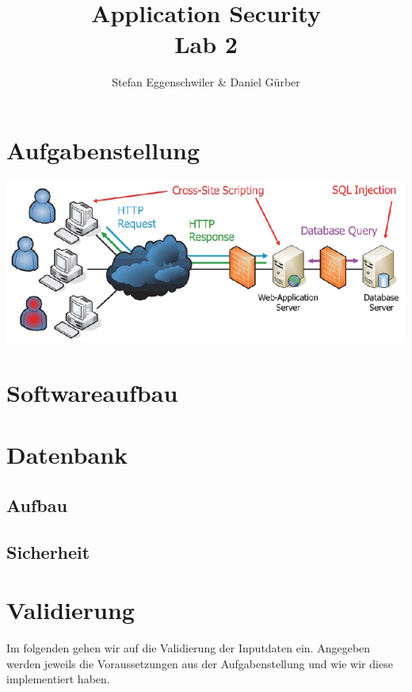 \documentclass[12pt]{scrartcl}
\author{Stefan Eggenschwiler \& Daniel Gürber}
\title{ %
Application Security
\\Lab 2
\vspace{0.2cm}
}
\begin{document}
 \maketitle
 \thispagestyle{firststyle}
 \pagestyle{firststyle}
 \begin{abstract}
 \begin{center}
 \end{center}
 \vspace{0.5cm}
\hrulefill
\end{abstract}

 \pagestyle{documentstyle}
 \tableofcontents
 \pagebreak
\section{Aufgabenstellung}
\includegraphics[scale=0.5]{./aufgabenstellung.jpg}

\section{Softwareaufbau}


\section{Datenbank}
\subsection{Aufbau}

\subsection{Sicherheit}

\section{Validierung}
Im folgenden gehen wir auf die Validierung der Inputdaten ein. Angegeben werden jeweils die Voraussetzungen aus der Aufgabenstellung und wie wir diese implementiert haben.
\end{document}
